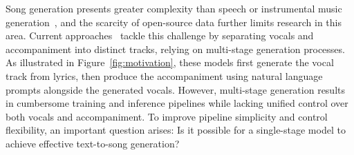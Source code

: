 
Song generation presents greater complexity than speech or instrumental music generation~\cite{lyth2024parler, chen2024valle2valle2,liu2024audioldm, copet2024musicgen}, and the scarcity of open-source data further limits research in this area.
Current approaches~\cite{hong2024Melodist, li2024melodyLM} tackle this challenge by separating vocals and accompaniment into distinct tracks, relying on multi-stage generation processes. As illustrated in Figure~\ref{fig:motivation}, these models first generate the vocal track from lyrics, then produce the accompaniment using natural language prompts alongside the generated vocals.
However, multi-stage generation results in cumbersome training and inference pipelines while lacking unified control over both vocals and accompaniment. To improve pipeline simplicity and control flexibility, an important question arises: Is it possible for a single-stage model to achieve effective text-to-song generation?



